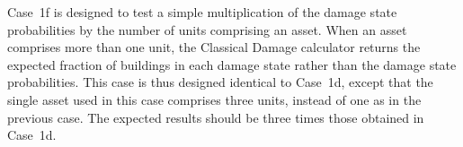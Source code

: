 Case~1f is designed to test a simple multiplication of the damage state probabilities by the number of units comprising an asset. When an asset comprises more than one unit, the Classical Damage calculator returns the expected fraction of buildings in each damage state rather than the damage state probabilities. This case is thus designed identical to Case~1d, except that the single asset used in this case comprises three units, instead of one as in the previous case. The expected results should be three times those obtained in Case~1d.